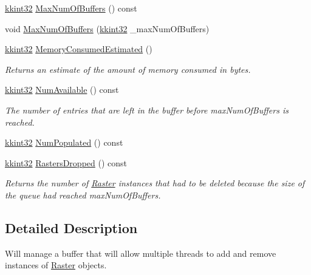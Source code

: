 \begin{DoxyCompactItemize}
\hyperlink{namespace_k_k_b_a8fa4952cc84fda1de4bec1fbdd8d5b1b}{kkint32} \hyperlink{class_k_k_b_1_1_raster_buffer_a5d5910c66454d7617b0f69f5d34ff5e2}{Max\+Num\+Of\+Buffers} () const 
\item 
void \hyperlink{class_k_k_b_1_1_raster_buffer_a192f09a93c83fde84d2a03680464220f}{Max\+Num\+Of\+Buffers} (\hyperlink{namespace_k_k_b_a8fa4952cc84fda1de4bec1fbdd8d5b1b}{kkint32} \+\_\+max\+Num\+Of\+Buffers)
\item 
\hyperlink{namespace_k_k_b_a8fa4952cc84fda1de4bec1fbdd8d5b1b}{kkint32} \hyperlink{class_k_k_b_1_1_raster_buffer_a72166588eea0d8c8d71acee0a493b404}{Memory\+Consumed\+Estimated} ()
\begin{DoxyCompactList}\small\item\em Returns an estimate of the amount of memory consumed in bytes. \end{DoxyCompactList}\item 
\hyperlink{namespace_k_k_b_a8fa4952cc84fda1de4bec1fbdd8d5b1b}{kkint32} \hyperlink{class_k_k_b_1_1_raster_buffer_ad9baa444f52d08b081e2ca22e3e40427}{Num\+Available} () const 
\begin{DoxyCompactList}\small\item\em The number of entries that are left in the buffer before \textquotesingle{}max\+Num\+Of\+Buffers\textquotesingle{} is reached. \end{DoxyCompactList}\item 
\hyperlink{namespace_k_k_b_a8fa4952cc84fda1de4bec1fbdd8d5b1b}{kkint32} \hyperlink{class_k_k_b_1_1_raster_buffer_add3930364963aa99a0cbdf3da17fa103}{Num\+Populated} () const 
\item 
\hyperlink{namespace_k_k_b_a8fa4952cc84fda1de4bec1fbdd8d5b1b}{kkint32} \hyperlink{class_k_k_b_1_1_raster_buffer_a0fe8436c22413ba4ab6eddbe3451625a}{Rasters\+Dropped} () const 
\begin{DoxyCompactList}\small\item\em Returns the number of \textquotesingle{}\hyperlink{class_k_k_b_1_1_raster}{Raster}\textquotesingle{} instances that had to be deleted because the size of the queue had reached \textquotesingle{}max\+Num\+Of\+Buffers\textquotesingle{}. \end{DoxyCompactList}\end{DoxyCompactItemize}


\subsection{Detailed Description}
Will manage a buffer that will allow multiple threads to add and remove instances of \textquotesingle{}\hyperlink{class_k_k_b_1_1_raster}{Raster}\textquotesingle{} objects. 

